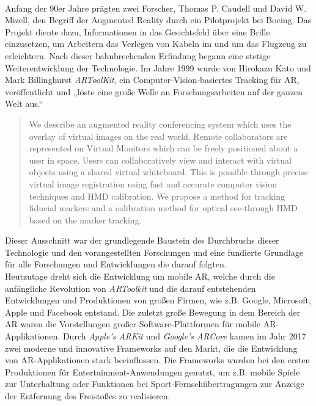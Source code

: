 \\ 
Anfang der 90er Jahre prägten zwei Forscher, Thomas P. Caudell und David W. Mizell, den Begriff der Augmented Reality durch ein Pilotprojekt
bei Boeing. Das Projekt diente dazu, Informationen in das Gesichtsfeld über eine Brille einzusetzen, um Arbeitern das Verlegen von Kabeln im und um das 
Flugzeug zu erleichtern. Nach dieser bahnbrechenden Erfindung begann eine stetige Weiterentwicklung der Technologie. Im Jahre 1999 wurde 
von Hirokazu Kato und Mark Billinghurst \textit{ARToolKit}, ein Computer-Vision-basiertes Tracking für AR, veröffentlicht und „löste eine 
große Welle an Forschungsarbeiten auf der ganzen Welt aus.“ \cite{springer.2019s} 
\begin{quote}
    We describe an augmented reality conferencing system which uses the overlay of virtual images on the real world. Remote collaborators 
    are represented on Virtual Monitors which can be freely positioned about a user in space. Users can collaboratively view and interact 
    with virtual objects using a shared virtual whiteboard. This is possible through precise virtual image registration using fast and 
    accurate computer vision techniques and HMD calibration. We propose a method for tracking fiducial markers and a calibration method 
    for optical see-through HMD based on the marker tracking. \cite{artoolkitsheet.1999o}
\end{quote}
Dieser Ausschnitt war der grundlegende Baustein des Durchbruchs dieser Technologie und den vorangestellten Forschungen und eine fundierte 
Grundlage für alle Forschungen und Entwicklungen die darauf folgten. 
\\ 
Heutzutage dreht sich die Entwicklung um mobile AR, welche durch die anfängliche Revolution von \textit{ARToolkit} und die darauf entstehenden 
Entwicklungen und Produktionen von großen Firmen, wie z.B. Google, Microsoft, Apple und Facebook entstand. Die zuletzt große Bewegung in dem 
Bereich der AR waren die Vorstellungen großer Software-Plattformen für mobile \acs{AR}-Applikationen. Durch \textit{Apple's ARKit} und \textit{Google's ARCore} 
kamen im Jahr 2017 zwei moderne und innovative Frameworks auf den Markt, die die Entwicklung von \acl{AR}-Applikationen stark beeinflussen.
Die Frameworks wurden bei den ersten Produktionen für Entertainment-Anwendungen genutzt, um z.B. mobile Spiele zur Unterhaltung oder 
Funktionen bei Sport-Fernsehübertragungen zur Anzeige der Entfernung des Freistoßes zu realisieren.
\\ 
\linebreak
